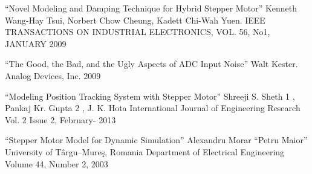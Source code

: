 \begin{thebibliography}{30}
     ``Novel Modeling and Damping Technique for Hybrid Stepper Motor''
                                            Kenneth Wang-Hay Tsui, Norbert Chow Cheung, Kadett Chi-Wah Yuen.
                                            IEEE TRANSACTIONS ON INDUSTRIAL ELECTRONICS, VOL. 56, No1, JANUARY 2009

     ``The Good, the Bad, and the Ugly Aspects of ADC Input Noise''
                                        Walt Kester. Analog Devices, Inc. 2009

     ``Modeling Position Tracking System with Stepper Motor''
                                                Shreeji S. Sheth 1 , Pankaj Kr. Gupta 2 , J. K. Hota
                                                International Journal of Engineering Research
                                                Vol. 2 Issue 2, February- 2013

     ``Stepper Motor Model for Dynamic Simulation''
                                                            Alexandru Morar
                                                            “Petru Maior” University of Târgu–Mureş,
                                                            Romania Department of Electrical Engineering
                                                            Volume 44, Number 2, 2003

\end{thebibliography}

\endinput

